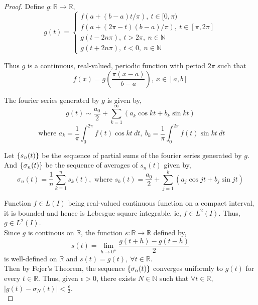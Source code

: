 \begin{proof}
	Define \(g : \mathbb{R} \to \mathbb{R}\),
	\[ g(t) = \begin{cases}
		f(a+(b-a)t/\pi),\ t \in [0,\pi) \\ f(a+(2\pi-t)(b-a)/\pi),\ t \in [\pi,2\pi] \\ g(t - 2n\pi),\ t > 2\pi,\ n \in \mathbb{N} \\ g(t+2n\pi),\ t < 0,\ n \in \mathbb{N} \end{cases}\]

		Thus $g$ is a continuous, real-valued, periodic function with period $2\pi$ such that
		\begin{equation}
			f(x) = g\left(\frac{\pi (x-a)}{b-a}\right),\ x \in [a,b] \label{equ:fx}
		\end{equation}

		The fourier series generated by $g$ is given by,
		\[ g(t) \sim \frac{a_0}{2} + \sum_{k=1}^\infty \left( a_k \cos kt + b_k \sin kt \right)\]
		\[ \text{ where } a_k = \frac{1}{\pi} \int_0^{2\pi} f(t) \cos kt\ dt,\ b_k = \frac{1}{\pi} \int_0^{2\pi} f(t) \sin kt\ dt\]

		Let \(\{s_n(t)\}\) be the sequence of partial sums of the fourier series generated by $g$.
		And \( \{\sigma_n(t)\}\)  be the sequence of averages of $s_n(t)$ given by,
		\[\sigma_n(t) = \frac{1}{n} \sum_{k = 1}^n s_k(t),\text{ where } s_k(t) = \frac{a_0}{2} + \sum_{j = 1}^k \left( a_j \cos jt + b_j \sin jt \right)\]

		Function \(f \in L(I)\) being real-valued continuous function on a compact interval, it is bounded and hence is Lebesgue square integrable.
		ie, \(f \in L^2(I)\).
		Thus, \(g \in L^2(I)\).\\

		Since $g$ is continous on $\mathbb{R}$, the function \(s : \mathbb{R} \to \mathbb{R}\) defined by,
		\[ s(t) = \lim_{h \to 0^+} \frac{g(t+h)-g(t-h)}{2} \]
		is well-defined on $\mathbb{R}$ and \(s(t) = g(t),\ \forall t \in \mathbb{R}\).\\

		Then by Fejer's Theorem, the sequence \(\{\sigma_n(t)\}\) converges uniformly to $g(t)$ for every \(t \in \mathbb{R}\).
		Thus, given \(\epsilon > 0\), there exists \(N \in \mathbb{N}\) such that \(\forall t \in \mathbb{R}\), \(|g(t)-\sigma_N(t)| < \frac{\epsilon}{2}\).\\


\end{proof}

